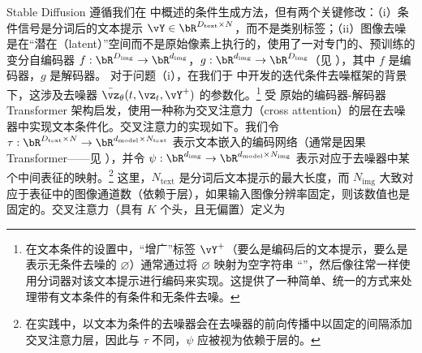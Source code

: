 \documentclass[../../book-main_zh.tex]{subfiles}
\begin{document}
Stable Diffusion 遵循我们在  中概述的条件生成方法，但有两个关键修改：（i）条件信号是分词后的文本提示 $\vY \in
\bR^{D_{\mathrm{text}} \times N}$，而不是类别标签；（ii）图像去噪是在“潜在（latent）”空间而不是原始像素上执行的，使用了一对专门的、预训练的变分自编码器 $f : \bR^{D_{\mathrm{img}}} \to
\bR^{d_{\mathrm{img}}}$，$g : \bR^{d_{\mathrm{img}}} \to
\bR^{D_{\mathrm{img}}}$（见 ），其中 $f$ 是编码器，$g$ 是解码器。
对于问题（i），在我们于  中开发的迭代条件去噪框架的背景下，这涉及去噪器 $\bar{\vz}_{\theta}(t, \vz_t, \vY^+)$ 的参数化。\footnote{在文本条件的设置中，“增广”标签 $\vY^+$（要么是编码后的文本提示，要么是表示无条件去噪的 $\varnothing$）通常通过将 $\varnothing$ 映射为空字符串 ``''，然后像往常一样使用分词器对该文本提示进行编码来实现。这提供了一种简单、统一的方式来处理带有文本条件的有条件和无条件去噪。}
\textcite{rombach2022high} 受 \textcite{vaswani2017attention} 原始的编码器-解码器 Transformer 架构启发，使用一种称为交叉注意力（cross attention）的层在去噪器中实现文本条件化。交叉注意力的实现如下。我们令 $\tau : \bR^{D_{\mathrm{text}} \times N} \to
\bR^{d_{\mathrm{model}} \times N_{\mathrm{text}}}$
表示文本嵌入的编码网络（通常是因果 Transformer——见 ），并令 $\psi : \bR^{d_{\mathrm{img}}}
\to \bR^{d_{\mathrm{model}} \times N_{\mathrm{img}}}$ 表示对应于去噪器中某个中间表征的映射。\footnote{在实践中，以文本为条件的去噪器会在去噪器的前向传播中以固定的间隔添加交叉注意力层，因此与 $\tau$ 不同，$\psi$ 应被视为依赖于层的。} %
这里，$N_{\mathrm{text}}$ 是分词后文本提示的最大长度，而 $N_{\mathrm{img}}$ 大致对应于表征中的图像通道数（依赖于层），如果输入图像分辨率固定，则该数值也是固定的。交叉注意力（具有 $K$ 个头，且无偏置）定义为
\end{document}
